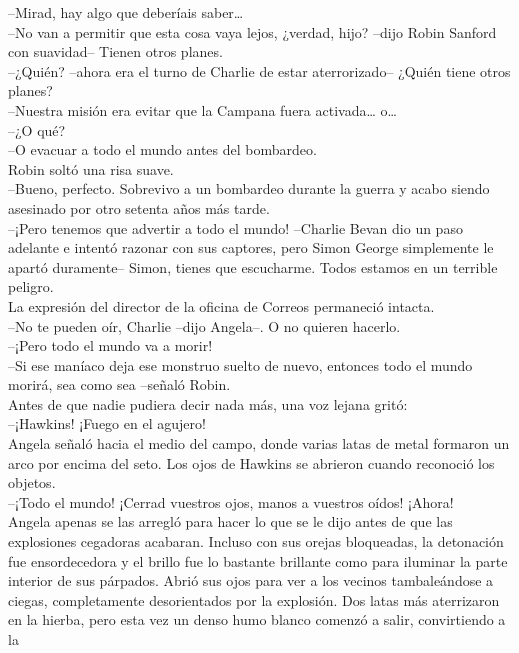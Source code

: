--Mirad, hay algo que deberíais saber\ldots{}\\
--No van a permitir que esta cosa vaya lejos, ¿verdad, hijo? --dijo
Robin Sanford con suavidad-- Tienen otros planes.\\
--¿Quién? --ahora era el turno de Charlie de estar aterrorizado-- ¿Quién
tiene otros planes?\\
--Nuestra misión era evitar que la Campana fuera activada\ldots{}
o\ldots{}\\
--¿O qué?\\
--O evacuar a todo el mundo antes del bombardeo.\\
Robin soltó una risa suave.\\
--Bueno, perfecto. Sobrevivo a un bombardeo durante la guerra y acabo
siendo asesinado por otro setenta años más tarde.\\
--¡Pero tenemos que advertir a todo el mundo! --Charlie Bevan dio un
paso adelante e intentó razonar con sus captores, pero Simon George
simplemente le apartó duramente-- Simon, tienes que escucharme. Todos
estamos en un terrible peligro.\\
La expresión del director de la oficina de Correos permaneció intacta.\\
--No te pueden oír, Charlie --dijo Angela--. O no quieren hacerlo.\\
--¡Pero todo el mundo va a morir!\\
--Si ese maníaco deja ese monstruo suelto de nuevo, entonces todo el
mundo morirá, sea como sea --señaló Robin.\\
Antes de que nadie pudiera decir nada más, una voz lejana gritó:\\
--¡Hawkins! ¡Fuego en el agujero!\\
Angela señaló hacia el medio del campo, donde varias latas de metal
formaron un arco por encima del seto. Los ojos de Hawkins se abrieron
cuando reconoció los objetos.\\
--¡Todo el mundo! ¡Cerrad vuestros ojos, manos a vuestros oídos!
¡Ahora!\\
Angela apenas se las arregló para hacer lo que se le dijo antes de que
las explosiones cegadoras acabaran. Incluso con sus orejas bloqueadas,
la detonación fue ensordecedora y el brillo fue lo bastante brillante
como para iluminar la parte interior de sus párpados. Abrió sus ojos
para ver a los vecinos tambaleándose a ciegas, completamente
desorientados por la explosión. Dos latas más aterrizaron en la hierba,
pero esta vez un denso humo blanco comenzó a salir, convirtiendo a la
